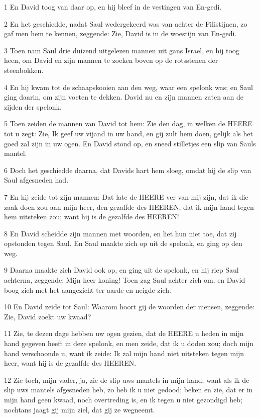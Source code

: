 \par 1 En David toog van daar op, en hij bleef in de vestingen van En-gedi.
\par 2 En het geschiedde, nadat Saul wedergekeerd was van achter de Filistijnen, zo gaf men hem te kennen, zeggende: Zie, David is in de woestijn van En-gedi.
\par 3 Toen nam Saul drie duizend uitgelezen mannen uit gans Israel, en hij toog heen, om David en zijn mannen te zoeken boven op de rotsstenen der steenbokken.
\par 4 En hij kwam tot de schaapskooien aan den weg, waar een spelonk was; en Saul ging daarin, om zijn voeten te dekken. David nu en zijn mannen zaten aan de zijden der spelonk.
\par 5 Toen zeiden de mannen van David tot hem: Zie den dag, in welken de HEERE tot u zegt: Zie, Ik geef uw vijand in uw hand, en gij zult hem doen, gelijk als het goed zal zijn in uw ogen. En David stond op, en sneed stilletjes een slip van Sauls mantel.
\par 6 Doch het geschiedde daarna, dat Davids hart hem sloeg, omdat hij de slip van Saul afgesneden had.
\par 7 En hij zeide tot zijn mannen: Dat late de HEERE ver van mij zijn, dat ik die zaak doen zou aan mijn heer, den gezalfde des HEEREN, dat ik mijn hand tegen hem uitsteken zou; want hij is de gezalfde des HEEREN!
\par 8 En David scheidde zijn mannen met woorden, en liet hun niet toe, dat zij opstonden tegen Saul. En Saul maakte zich op uit de spelonk, en ging op den weg.
\par 9 Daarna maakte zich David ook op, en ging uit de spelonk, en hij riep Saul achterna, zeggende: Mijn heer koning! Toen zag Saul achter zich om, en David boog zich met het aangezicht ter aarde en neigde zich.
\par 10 En David zeide tot Saul: Waarom hoort gij de woorden der mensen, zeggende: Zie, David zoekt uw kwaad?
\par 11 Zie, te dezen dage hebben uw ogen gezien, dat de HEERE u heden in mijn hand gegeven heeft in deze spelonk, en men zeide, dat ik u doden zou; doch mijn hand verschoonde u, want ik zeide: Ik zal mijn hand niet uitsteken tegen mijn heer, want hij is de gezalfde des HEEREN.
\par 12 Zie toch, mijn vader, ja, zie de slip uws mantels in mijn hand; want als ik de slip uws mantels afgesneden heb, zo heb ik u niet gedood; beken en zie, dat er in mijn hand geen kwaad, noch overtreding is, en ik tegen u niet gezondigd heb; nochtans jaagt gij mijn ziel, dat gij ze wegneemt.
